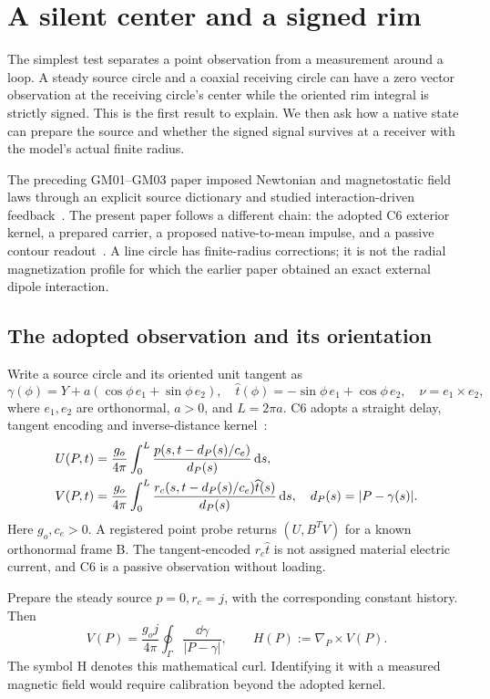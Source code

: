 \section{A silent center and a signed rim}\label{sec:coaxial}
The simplest test separates a point observation from a measurement around a loop. A steady source circle and a coaxial receiving circle can have a zero vector observation at the receiving circle's center while the oriented rim integral is strictly signed. This is the first result to explain. We then ask how a native state can prepare the source and whether the signed signal survives at a receiver with the model's actual finite radius.

The preceding GM01--GM03 paper imposed Newtonian and magnetostatic field laws through an explicit source dictionary and studied interaction-driven feedback~\cite{GM123}. The present paper follows a different chain: the adopted C6 exterior kernel, a prepared carrier, a proposed native-to-mean impulse, and a passive contour readout~\cite{GM04,GM05,GM06}. A line circle has finite-radius corrections; it is not the radial magnetization profile for which the earlier paper obtained an exact external dipole interaction.

\subsection{The adopted observation and its orientation}
Write a source circle and its oriented unit tangent as
\begin{equation}\label{eq:sourcecircle}
\gamma(\phi)=Y+a(\cos\phi\,e_1+\sin\phi\,e_2),\quad
\widehat t(\phi)=-\sin\phi\,e_1+\cos\phi\,e_2,\quad
\nu=e_1\times e_2,
\end{equation}
where \(e_1,e_2\) are orthonormal, \(a>0\), and \(L=2\pi a\).
C6 adopts a straight delay, tangent encoding and inverse-distance kernel~\cite{PAIRII,INT}:
\begin{align}
U(P,t)&=\frac{g_o}{4\pi}\int_0^L
\frac{p(s,t-d_P(s)/c_e)}{d_P(s)}\,\mathrm d s,\notag\\
V(P,t)&=\frac{g_o}{4\pi}\int_0^L
\frac{r_c(s,t-d_P(s)/c_e)\widehat t(s)}{d_P(s)}\,\mathrm d s,
\quad d_P(s)=|P-\gamma(s)|. \label{eq:C6}
\end{align}
Here \(g_o,c_e>0\). A registered point probe returns \((U,B^TV)\) for a known orthonormal frame B. The tangent-encoded \(r_c\widehat t\) is not assigned material electric current, and C6 is a passive observation without loading.

Prepare the steady source \(p=0,r_c=j\), with the corresponding constant history. Then
\begin{equation}\label{eq:staticV}
V(P)=\frac{g_oj}{4\pi}\oint_{\Gamma}\frac{\dd\gamma}{|P-\gamma|},
\qquad H(P):=\nabla_P\times V(P).
\end{equation}
The symbol H denotes this mathematical curl. Identifying it with a measured magnetic field would require calibration beyond the adopted kernel.

